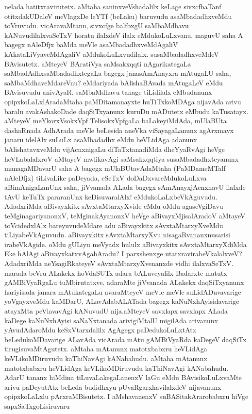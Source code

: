 nelada hatitxravirutetx. aMtaha saninxveVshadalilx keLage sivxcfbaTanf otitxdakUDaleV meVlagxDe leYTf (beLaku) baruvudu asaMbadadhxveMdu toVruvudu. vicAravaMtanu, \hbox{sivxcfge} balfbxgU saMbaMdhavu kANuvu\-dilalx\-vaSeTxV horatu ilalxdeV ilalx eMdukoLuLxvanu. maguvU saha A bagegx nAleDfjx baMda meVle asaM\-badadhx\-veMdAgaliV kAkataLiVya\-veMdAgaliV aMdukoLuLxvudilalx. susaMbadadhxveMdeV BAvisutetx. aMteyeV BAra\-tiVya saMsakxqqti nAgarikategaLa saMbadAdhxsaMbadadhxtegaLa bagegx janasAmAnayxra mAtu\-gaLU saha, saMbaMdha\-veMda\-reVnu? eMdariyada bAlishaBAvada mAtugaLeV eMdu BAvisu\-vudu ani\-vAyaR. saMbaMdhavu\- tanage tiLi\-dilalx eMbudanunx opipxkoLaLx\-lAra\-daMtaha paMDitamanayxte huTiTx\-koMDAga nija\-vAda arivu bara\-lu ava\-kAsha\-koDade daqSiTxyanunx kuruDu mADutetx  eMbudu kaTusatayx. aMteyeV meYkorxV\-sokxVpf Teli\-sokxVpf\-gaLa baLakeyiMdAda, mUlaBUta dashaRnada AdhArada meVle beLesida aneVka viSaya\-gaLanunx \-agArxmayx janaru idelAlx suLuLx asaMbadadhx eMdu heVLi\-dAga adanunx bAlishatavxveMdu vijAcnxnigaLu diTaTx\-tana\-diMda dheYyaRvAgi heVge heVLa\-balalxroV aMtayeV mwlikavAgi saMsakxqqtiya susaMbadadhxteyanunx mana\-gaMDa\-varU saha A bagegx mUlaBUtavAdaMtaha (PaMDameMTalf nAleDfjx) tiLivaLike paDeyada, eSeTxV doDaDxva\-reMdu\-koLuLxva aBimAnigaLanUnx saha, jiVvanada ALada bagegx sAmAnayxjAcnxnavU ilalxde tAvU \-keTuTx pararanUnx keDisuvaralAlx! eMdukoLaLxbeVkAguvudu. AdadxriMda aBivayxkitx sAvxtaMtarxyXvide eMdu oMdu agaseVgiDavu teMginagariyanonxV, teMginakAyanonxV heVge aBi\-vayxMjisa\-lAradoV \-aMtayeV toVci\-dedxlAlx bareyuvudeMdare adu aBivayxkitx sAvxtaMtarxyXveMdu tiLiyabeVkAguvudu. aBi\-vayxkitx sAvxtaM\-tarxyXvu nisagaRvananxnusarisi irabeVkAgide. oMdu gULiyu meVyadx hululx aBi\-vayxkitx sAvxtaMtarxyX\-diMda Eke hAlAgi aBivayxkatxvAgabAradu? I parxshenxge utatxravirabeVka\-lalxveV? AdadxriMda neYsagiR\-kateyeV sAvxtaM\-tarxyXvenanxde vidhi ilalxvaSeTxV. marada beVru ALakekx hoVdaSUTx adara bALuveyalilx Badarxte matutx gAMBiVyaR\-gaLu tuMbiru\-tatxve. adaraMte jiVvanada ALakekx daqSiTxyanunx hariyisada janara mAtukategaLu ava\-raMteyeV meVle meVle suLidADuvavarige yoVgayxveMdu kaMDarU, ALavAda\break bALATada bagegx kaNuNx\-hAyisidavarige atayxMta peVlavavAgi kANuvudU nija.\break aMteyeV savxlapx savxlapx ALada kaDege kaNuNxhAyisi saNaNxtanada arivi\-giMtalU migi\-lAda arivanunx yAvudAdaroMdu keSxVtarxdalilx AgAgegx paDedukoLuLxtAtx beLedu\-koMDava\-rige ALavAda vicArada mAtu gAMBiV\-yaRda kaDegeV daqSiTx tiru\-gisu\-vaMtA\-gutetx. aMtaha mAtanunx matotx\-babxru heVLidAga keVLikoMDiruvudu kaThiNa\-vAgi kANa\-bahudu. aMtaha mAtanunx matotxbabxru heVLidAga keVLikoMDiruvudu kaThiNavAgi kANabahudu. AdarU tananx hiMdina tiLuvaLakegaLanenxV laGu eMdu BAvisikoLuLxvaMte arivu paDeyutAtx beLeda budidhxyu pUvaRgarxhavilalxdeV nijavanunx opipxkoLaLxlu pArxraMBisutetx. I aMshavanenxV suBASitakArarobabxru hiVge sapxSaTxgoLisiruvaru-


